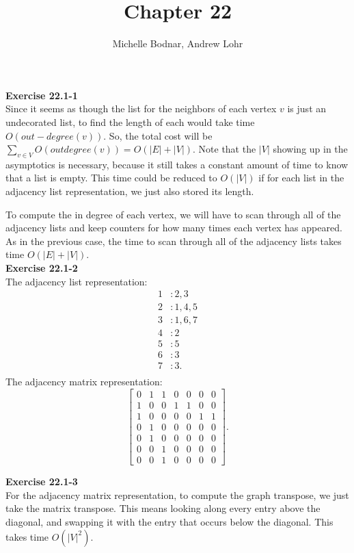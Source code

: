 \documentclass{article}
\title{Chapter 22}
\author{Michelle Bodnar, Andrew Lohr}
\begin{document}
\maketitle


\noindent\textbf{Exercise 22.1-1}\\

Since it seems as though the list for the neighbors of each vertex $v$ is just an undecorated list, to find the length of each would take time $O(out-degree(v))$. So, the total cost will be $\sum_{v\in V} O(outdegree(v)) = O(|E| +|V|)$. Note that the $|V|$ showing up in the asymptotics is necessary, because it still takes a constant amount of time to know that a list is empty. This time could be reduced to $O(|V|)$ if for each list in the adjacency list representation, we just also stored its length.

To compute the in degree of each vertex, we will have to scan through all of the adjacency lists and keep counters for how many times each vertex has appeared. As in the previous case, the time to scan through all of the adjacency lists takes time $O(|E|+|V|)$.\\

\noindent\textbf{Exercise 22.1-2}\\

The adjacency list representation:
\begin{align*}
1&: 2,3\\
2&: 1,4,5 \\
3&: 1,6,7\\
4&: 2\\
5&: 5\\
6&: 3\\
7&: 3.\\
\end{align*}
The adjacency matrix representation:
\[ \left[\begin{array}{ccccccc} 0&1&1&0&0&0&0 \\ 1&0&0&1&1&0&0 \\ 1&0&0&0&0&1&1 \\ 0&1&0&0&0&0&0 \\ 0&1&0&0&0&0&0 \\ 0&0&1&0&0&0&0 \\ 0&0&1&0&0&0&0  \end{array}\right]. \]

\noindent\textbf{Exercise 22.1-3}\\

For the adjacency matrix representation, to compute the graph transpose, we just take the matrix transpose. This means looking along every entry above the diagonal, and swapping it with the entry that occurs below the diagonal. This takes time $O(|V|^2)$.
\end{document}
